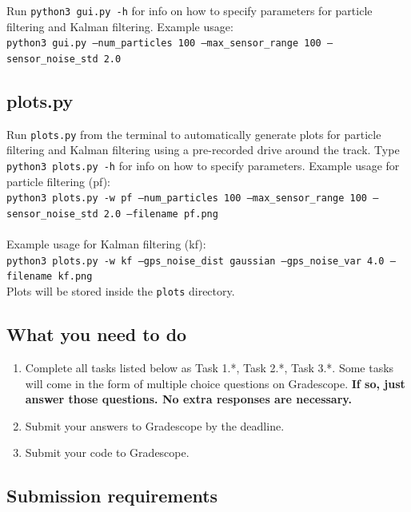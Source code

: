 \documentclass[a4paper]{article}
\begin{document}
\noindent
Run \texttt{python3 gui.py -h} for info on how to specify parameters for particle filtering and Kalman filtering. Example usage:\\

\texttt{python3 gui.py --num\_particles 100 --max\_sensor\_range 100 --sensor\_noise\_std 2.0}\\

\subsection*{plots.py}

Run \texttt{plots.py} from the terminal to automatically generate plots for particle filtering and Kalman filtering using a pre-recorded drive around the track. Type \texttt{python3 plots.py -h} for info on how to specify parameters. Example usage for particle filtering (pf):\\

\noindent
\texttt{python3 plots.py -w pf --num\_particles 100 --max\_sensor\_range 100 --sensor\_noise\_std 2.0 --filename pf.png}\\\\

Example usage for Kalman filtering (kf):\\

\texttt{python3 plots.py -w kf --gps\_noise\_dist gaussian --gps\_noise\_var 4.0 --filename kf.png}\\

Plots will be stored inside the \texttt{plots} directory.

\subsection*{What you need to do}

\begin{enumerate}
    \item Complete all tasks listed below as Task 1.*, Task 2.*, Task 3.*. Some tasks will come in the form of multiple choice questions on Gradescope. \textbf{If so, just answer those questions. No extra responses are necessary.}
    \item Submit your answers to Gradescope by the deadline.
    \item Submit your code to Gradescope.
\end{enumerate}

\subsection*{Submission requirements}
\end{document}

